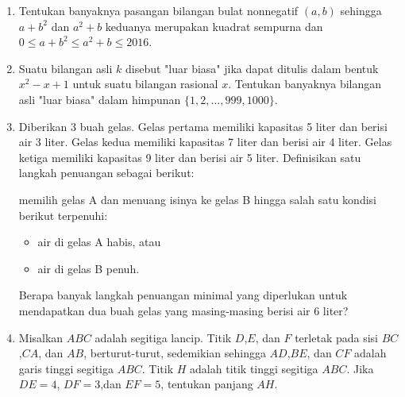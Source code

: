 \documentclass[12pt]{scrartcl}
\begin{document}
\begin{enumerate}[resume]
		\item Tentukan banyaknya pasangan bilangan bulat nonnegatif $(a,b)$ sehingga $a+b^2$ dan $a^2+b$ keduanya merupakan kuadrat sempurna dan $0 \le a+b^2 \le a^2+b \le 2016.$
		
		\item Suatu bilangan asli $k$ disebut "luar biasa" jika dapat ditulis dalam bentuk $x^2-x+1$ untuk suatu bilangan rasional $x$. Tentukan banyaknya bilangan asli "luar biasa" dalam himpunan $\{1,2,\dots,999,1000\}$.
		
		\item Diberikan 3 buah gelas. Gelas pertama memiliki kapasitas 5 liter dan berisi air 3 liter. Gelas kedua memiliki kapasitas 7 liter dan berisi air 4 liter. Gelas ketiga memiliki kapasitas 9 liter dan berisi air 5 liter. Definisikan satu langkah penuangan sebagai berikut: 
		
		memilih gelas A dan menuang isinya ke gelas B hingga salah satu kondisi berikut terpenuhi:
		\begin{itemize}
			\item air di gelas A habis, atau
			\item air di gelas B penuh.
		\end{itemize}
	Berapa banyak langkah penuangan minimal yang diperlukan untuk mendapatkan dua buah gelas yang masing-masing berisi air 6 liter?
	
	\item Misalkan $ABC$ adalah segitiga lancip. Titik $D$,$E$, dan $F$ terletak pada sisi $BC$,$CA$, dan $AB$, berturut-turut, sedemikian sehingga $AD$,$BE$, dan $CF$ adalah garis tinggi segitiga $ABC$. Titik $H$ adalah titik tinggi segitiga $ABC$. Jika $DE=4$, $DF=3$,dan $EF=5$, tentukan panjang $AH$.
\end{enumerate}
\end{document}
